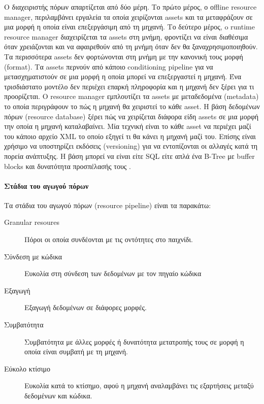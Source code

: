 Ο διαχειριστής πόρων απαρτίζεται από δύο μέρη. Το πρώτο μέρος, ο οffline resource manager, περιλαμβάνει εργαλεία τα οποία χειρίζονται assets και τα μεταφράζουν σε μια μορφή η οποία είναι επεξεργάσιμη από τη μηχανή. Το δεύτερο μέρος, o runtime resource manager διαχειρίζεται τα assets στη μνήμη, φροντίζει να είναι διαθέσιμα όταν χρειάζονται και να αφαιρεθούν από τη μνήμη όταν δεν θα ξαναχρησιμοποιηθούν.
Τα περισσότερα assets δεν φορτώνονται στη μνήμη με την κανονική τους μορφή (format). Τα assets περνούν από κάποιο conditioning pipeline για να μετασχηματιστούν σε μια μορφή η οποία μπορεί να επεξεργαστεί η μηχανή. Ένα τρισδιάστατο μοντέλο δεν περιέχει επαρκή πληροφορία και η μηχανή δεν ξέρει για τι προορίζεται. Ο resource manager εμπλουτίζει τα assets με μεταδεδομένα (metadata) το οποία περιγράφουν το πώς η μηχανή θα χειριστεί το κάθε asset.
H βάση δεδομένων πόρων (resource database) ξέρει πώς να χειρίζεται διάφορα είδη assets σε μια μορφή την οποία η μηχανή καταλαβαίνει. Μία  τεχνική είναι το κάθε asset να περιέχει μαζί του κάποιο αρχείο \gls{XML} το οποίο εξηγεί τι θα κάνει η μηχανή μαζί του. Επίσης είναι χρήσιμο να υποστηρίζει  εκδόσεις (versioning) για να εντοπίζονται οι αλλαγές κατά τη πορεία ανάπτυξης. Η βάση μπορεί να είναι είτε SQL είτε απλά ένα \gls{B-Tree} με buffer blocks και δυνατότητα προσπέλασής τους \cite{Sousa:2002:GPO:580160}.

\paragraph{Στάδια του αγωγού πόρων}
Τα στάδια του αγωγού πόρων (resource pipeline) είναι τα παρακάτω:
\begin{description}
\item [Granular resoures] Πόροι οι οποία συνδέονται με τις οντότητες στο παιχνίδι. 
\item [Σύνδεση με κώδικα] Ευκολία στη σύνδεση των δεδομένων με τον πηγαίο κώδικα
\item [Εξαγωγή] Εξαγωγή δεδομένων σε διάφορες μορφές.
\item [Συμβατότητα] Συμβατότητα με άλλες μορφές ή δυνατότητα μετατροπής τους σε μορφή η οποία είναι συμβατή με τη μηχανή.
\item [Εύκολο κτίσιμο] Ευκολία κατά το κτίσημο, αφού η μηχανή αναλαμβάνει τις εξαρτήσεις μεταξύ δεδομένων και κώδικα.
\end{description}

